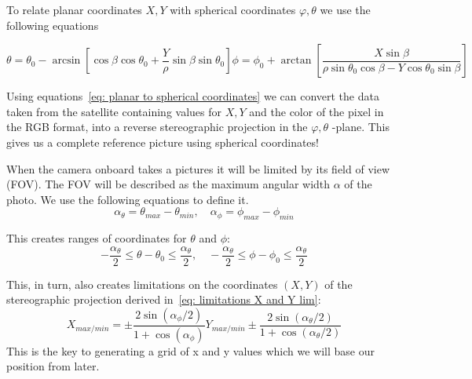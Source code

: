 \documentclass[reprint,english,notitlepage]{revtex4-2}
\begin{document}
To relate planar coordinates $ X,Y $ with spherical coordinates $ \varphi, \theta $ we use the following equations

\begin{subequations} \label{eq: planar to spherical coordinates}
	\begin{equation}
	  \theta = \theta_0 - \arcsin \left[ \cos β \cos θ _{0} + \frac{Y}{\rho} \sin β \sin θ _{0}\right] 
	\end{equation}
	\begin{equation}
	  \phi = \phi _{0} + \arctan \left[ \frac{X \sin \beta}{\rho \sin \theta _{0} \cos \beta - Y \cos  \theta _{0} \sin  \beta} \right] 
	\end{equation}
  \end{subequations}


Using equations~\ref{eq: planar to spherical coordinates} we can convert the data taken from the satellite containing values for $ X,Y  $ and the color of the pixel in the RGB format, into a reverse stereographic projection in the $ \varphi, \theta $ -plane.
This gives us a complete reference picture using spherical coordinates!

When the camera onboard takes a pictures it will be limited by its field of view (FOV).
The FOV will be described as the maximum angular width $ \alpha $ of the photo.
We use the following equations to define it.
\begin{equation} \label{eq: max angular width}
	α _{\theta} = θ _{max} - \theta _{min}, \quad α _{\phi} = ϕ _{max} - ϕ _{min}
\end{equation}

This creates ranges of coordinates for $\theta$ and $\phi$:
\begin{equation}\label{eq: limitations phi and theta}
  - \frac{\alpha _{\theta}}{2} \le θ - θ _{0} \le \frac{\alpha _{\theta }}{2}, \quad - \frac{\alpha _{\theta}}{2} \le ϕ  - ϕ _{0} \le \frac{\alpha _{\theta }}{2}
\end{equation}

This, in turn, also creates limitations on the coordinates $ (X,Y) $ of the stereographic projection derived in~\ref{eq: limitations X and Y lim}:
\begin{subequations} \label{eq: limitations X and Y lim}
	\begin{equation}
		X _{max / min} = ± \frac{2 \sin (α _{\phi} / 2)}{1 + \cos (\alpha _{\phi})}
	  \end{equation}
	  
	  
	\begin{equation}
		Y _{max / min} ± \frac{2 \sin (\alpha _{\theta}  / 2)}{1 + \cos (α _{\theta}/2)}
	\end{equation}
	
\end{subequations}
This is the key to generating a grid of x and y values which we will base our position from later. 
\end{document}
